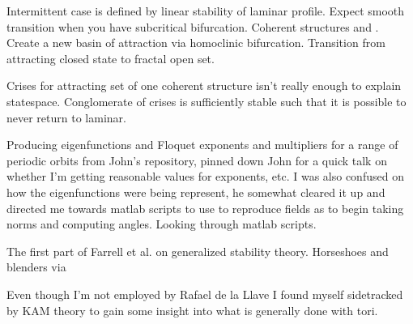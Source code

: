 \begin{description}
{\begin{description}
Intermittent case is defined by linear stability of laminar profile.
Expect smooth transition when you have subcritical bifurcation.
Coherent structures and {\statesp}. Create a new basin of attraction
via homoclinic bifurcation. Transition from attracting closed state
to fractal open set.

Crises for attracting set of one coherent structure isn't really enough
to explain statespace. Conglomerate of crises is sufficiently stable such that it is possible to never return to laminar.

\item[Arnoldi]
Producing eigenfunctions and Floquet exponents and multipliers for a range
of periodic orbits from John's repository, pinned down John for a quick talk on whether I'm getting reasonable values for exponents, etc. I was also confused on how the eigenfunctions were being represent, he somewhat
cleared it up and directed me towards matlab scripts to use to reproduce
fields as to begin taking norms and computing angles. Looking through matlab scripts.

\item[Readings]
The first part of Farrell et al. on generalized stability theory.
Horseshoes and blenders via

\item[KAM]
Even though I'm not employed by Rafael de la Llave I found myself sidetracked by
KAM theory to gain some insight into what is generally done with tori.
\end{description}
}

\end{description}
